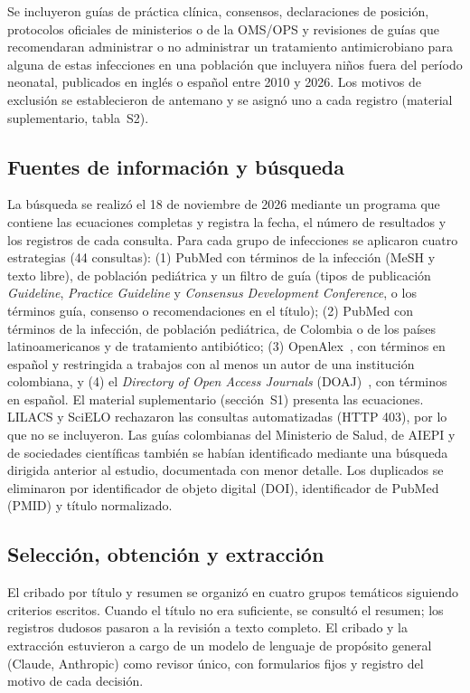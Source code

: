 \documentclass[11pt,a4paper]{article}
\begin{document}
Se incluyeron guías de práctica clínica, consensos, declaraciones de posición, protocolos oficiales de ministerios o de la OMS/OPS y revisiones de guías que recomendaran administrar o no administrar un tratamiento antimicrobiano para alguna de estas infecciones en una población que incluyera niños fuera del período neonatal, publicados en inglés o español entre 2010 y 2026. Los motivos de exclusión se establecieron de antemano y se asignó uno a cada registro (material suplementario, tabla~S2).

\subsection{Fuentes de información y búsqueda}

La búsqueda se realizó el 18 de noviembre de 2026 mediante un programa que contiene las ecuaciones completas y registra la fecha, el número de resultados y los registros de cada consulta. Para cada grupo de infecciones se aplicaron cuatro estrategias (44 consultas): (1) PubMed con términos de la infección (MeSH y texto libre), de población pediátrica y un filtro de guía (tipos de publicación \emph{Guideline}, \emph{Practice Guideline} y \emph{Consensus Development Conference}, o los términos guía, consenso o recomendaciones en el título); (2) PubMed con términos de la infección, de población pediátrica, de Colombia o de los países latinoamericanos y de tratamiento antibiótico; (3) OpenAlex~\citep{openalex}, con términos en español y restringida a trabajos con al menos un autor de una institución colombiana, y (4) el \emph{Directory of Open Access Journals} (DOAJ)~\citep{doaj}, con términos en español. El material suplementario (sección~S1) presenta las ecuaciones. LILACS y SciELO rechazaron las consultas automatizadas (HTTP 403), por lo que no se incluyeron. Las guías colombianas del Ministerio de Salud, de AIEPI y de sociedades científicas también se habían identificado mediante una búsqueda dirigida anterior al estudio, documentada con menor detalle. Los duplicados se eliminaron por identificador de objeto digital (DOI), identificador de PubMed (PMID) y título normalizado.

\subsection{Selección, obtención y extracción}

El cribado por título y resumen se organizó en cuatro grupos temáticos siguiendo criterios escritos. Cuando el título no era suficiente, se consultó el resumen; los registros dudosos pasaron a la revisión a texto completo. El cribado y la extracción estuvieron a cargo de un modelo de lenguaje de propósito general (Claude, Anthropic) como revisor único, con formularios fijos y registro del motivo de cada decisión.
\end{document}
